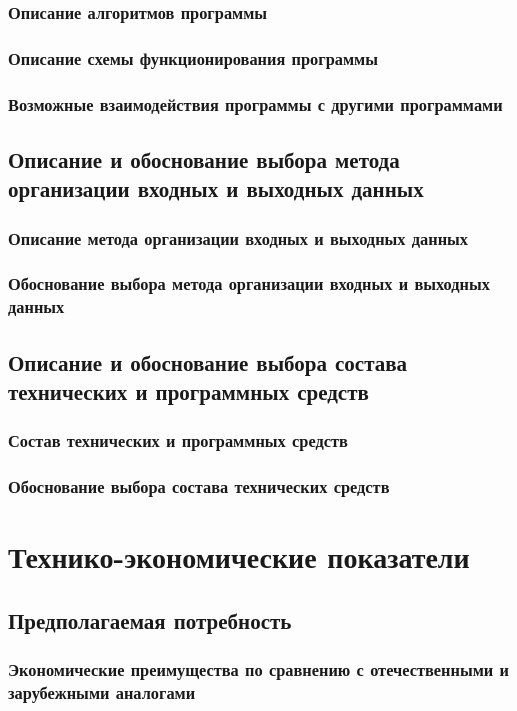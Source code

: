 \documentclass[a4paper,12pt]{article}
\begin{document}
	\subsubsection{Описание алгоритмов программы}
	\subsubsection{Описание схемы функционирования программы}
	\subsubsection{Возможные взаимодействия программы с другими программами}
	\subsection{Описание и обоснование выбора метода организации входных и выходных данных}
	\subsubsection{Описание метода организации входных и выходных данных}
	\subsubsection{Обоснование выбора метода организации входных и выходных данных}
	\subsection{Описание и обоснование выбора состава технических и программных средств}
	\subsubsection{Состав технических и программных средств}
	\subsubsection{Обоснование выбора состава технических средств}
	
						\newpage
	\section{Технико-экономические показатели}
	\subsection{Предполагаемая потребность}
	\subsubsection{Экономические преимущества по сравнению с отечественными и зарубежными аналогами}
\end{document}
